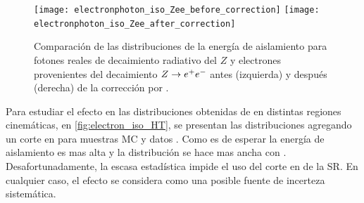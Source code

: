 
\begin{figure}[!htbp]
  \centering

  \texttt{[image: electronphoton\_iso\_Zee\_before\_correction]}
  \texttt{[image: electronphoton\_iso\_Zee\_after\_correction]}

  \caption{Comparación de las distribuciones de la energía de aislamiento para fotones reales de
    decaimiento radiativo del $Z$ y electrones provenientes del decaimiento $Z \rightarrow e^+ e^-$ antes (izquierda)
    y después (derecha) de la corrección por \pt.}
    \label{fig:photon_electron_iso}

\end{figure}





Para estudiar el efecto en las distribuciones obtenidas de {\Zee} en distintas
regiones cinemáticas, en \cref{fig:electron_iso_HT}, se presentan las
distribuciones agregando un corte en {\HT} para muestras MC y datos {\Zee}. Como
es de esperar la energía de aislamiento es mas alta y la distribución se hace
mas ancha con \HT.
Desafortunadamente, la escasa estadística impide el uso del corte en {\HT} de la
SR. En cualquier caso, el efecto se considera como una posible fuente de
incerteza sistemática.

